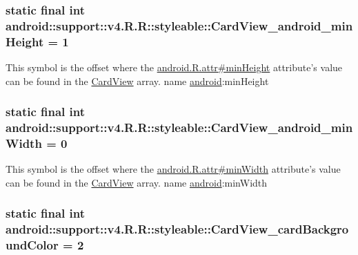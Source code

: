 \hypertarget{classandroid_1_1support_1_1v4_1_1_r_1_1styleable_577b2e52dc2fbfc09f905ea26e5f682e}{
\subsubsection[{CardView\_\-android\_\-minHeight}]{\setlength{\rightskip}{0pt plus 5cm}static final int android::support::v4.R.R::styleable::CardView\_\-android\_\-minHeight = 1}}
\label{classandroid_1_1support_1_1v4_1_1_r_1_1styleable_577b2e52dc2fbfc09f905ea26e5f682e}


This symbol is the offset where the \hyperlink{}{android.R.attr\#minHeight} attribute's value can be found in the \hyperlink{classandroid_1_1support_1_1v4_1_1_r_1_1styleable_4fcc6453aa91deadd7072add3aee5e56}{CardView} array.  name \hyperlink{namespaceandroid}{android}:minHeight \hypertarget{classandroid_1_1support_1_1v4_1_1_r_1_1styleable_3cd23d6fa94330913ba4cb084d788c59}{
\subsubsection[{CardView\_\-android\_\-minWidth}]{\setlength{\rightskip}{0pt plus 5cm}static final int android::support::v4.R.R::styleable::CardView\_\-android\_\-minWidth = 0}}
\label{classandroid_1_1support_1_1v4_1_1_r_1_1styleable_3cd23d6fa94330913ba4cb084d788c59}


This symbol is the offset where the \hyperlink{}{android.R.attr\#minWidth} attribute's value can be found in the \hyperlink{classandroid_1_1support_1_1v4_1_1_r_1_1styleable_4fcc6453aa91deadd7072add3aee5e56}{CardView} array.  name \hyperlink{namespaceandroid}{android}:minWidth \hypertarget{classandroid_1_1support_1_1v4_1_1_r_1_1styleable_94fc58f0d182831ec612958ddf3d8b9f}{
\subsubsection[{CardView\_\-cardBackgroundColor}]{\setlength{\rightskip}{0pt plus 5cm}static final int android::support::v4.R.R::styleable::CardView\_\-cardBackgroundColor = 2}}
\label{classandroid_1_1support_1_1v4_1_1_r_1_1styleable_94fc58f0d182831ec612958ddf3d8b9f}


